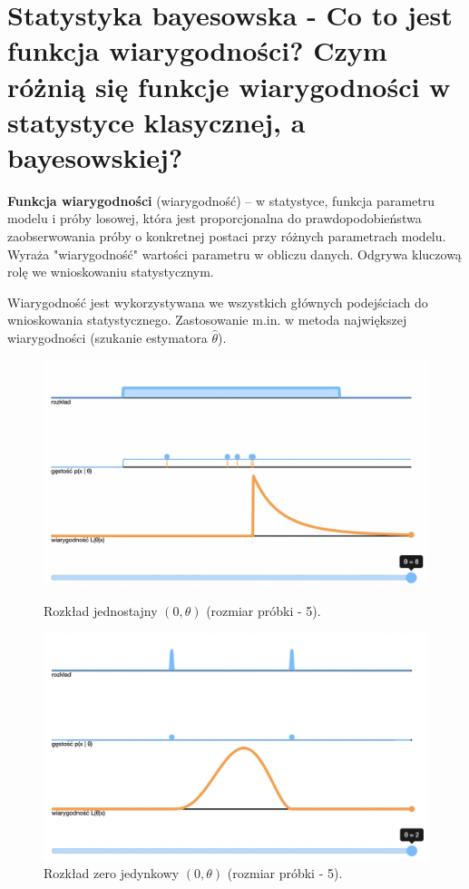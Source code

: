 \section{Statystyka bayesowska - Co to jest funkcja wiarygodności?
Czym różnią się funkcje wiarygodności w statystyce klasycznej, a bayesowskiej?}

\textbf{Funkcja wiarygodności} (wiarygodność) – w statystyce, funkcja parametru modelu i próby losowej,
która jest proporcjonalna do prawdopodobieństwa zaobserwowania próby o konkretnej postaci przy różnych parametrach modelu.
Wyraża "wiarygodność" wartości parametru w obliczu danych.
Odgrywa kluczową rolę we wnioskowaniu statystycznym.

Wiarygodność jest wykorzystywana we wszystkich głównych podejściach do wnioskowania statystycznego.
Zastosowanie m.in. w metoda największej wiarygodności (szukanie estymatora $\hat{\theta}$).

\begin{figure}
    \centering
    \begin{minipage}{0.45\textwidth}
        \centering
        \includegraphics[scale=0.27]{images/likelihood-uniform}
        \caption{Rozkład jednostajny $(0, \theta)$ (rozmiar próbki - 5).}
    \end{minipage}
    \begin{minipage}{0.45\textwidth}
        \centering
        \includegraphics[scale=0.27]{images/likelihood-zero-one}
        \caption{Rozkład zero jedynkowy $(0, \theta)$ (rozmiar próbki - 5).}
    \end{minipage}
\end{figure}


